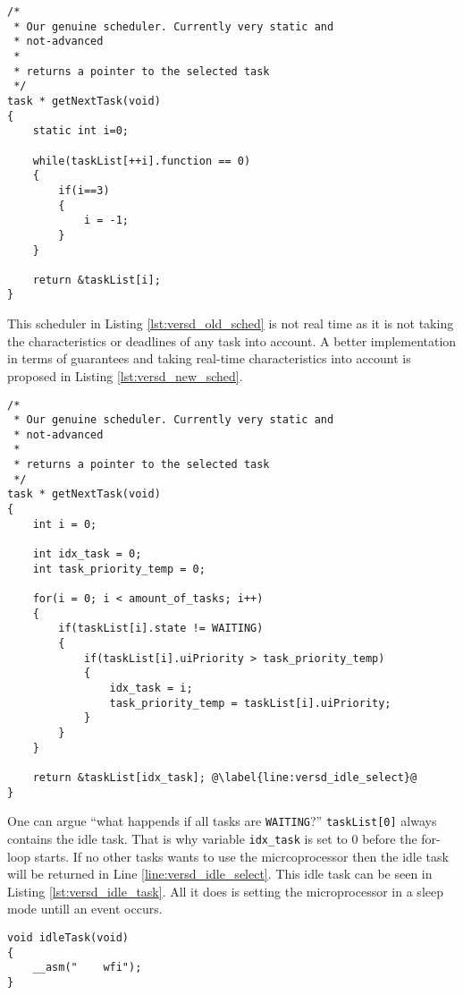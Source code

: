 \begin{lstlisting}[style=CStyle, caption={A relatively stupid scheduler}, captionpos=b, label={lst:versd_old_sched}, escapechar=@]
/*
 * Our genuine scheduler. Currently very static and
 * not-advanced
 *
 * returns a pointer to the selected task
 */
task * getNextTask(void)
{
	static int i=0;

	while(taskList[++i].function == 0)
	{
		if(i==3)
		{
			i = -1;
		}
	}

	return &taskList[i];
}
\end{lstlisting}

This scheduler in Listing \ref{lst:versd_old_sched} is not real time as it is not taking the characteristics or deadlines of any task into account.
A better implementation in terms of guarantees and taking real-time characteristics into account is proposed in Listing \ref{lst:versd_new_sched}.

\newpage
\begin{lstlisting}[style=CStyle, caption={An improved scheduler taking task characteristics into account}, captionpos=b, label={lst:versd_new_sched}, escapechar=@]
/*
 * Our genuine scheduler. Currently very static and
 * not-advanced
 *
 * returns a pointer to the selected task
 */
task * getNextTask(void)
{
    int i = 0;

    int idx_task = 0;
    int task_priority_temp = 0;

    for(i = 0; i < amount_of_tasks; i++)
    {
	    if(taskList[i].state != WAITING)
	    {
            if(taskList[i].uiPriority > task_priority_temp)
            {
                idx_task = i;
                task_priority_temp = taskList[i].uiPriority;
            }
        }
    }

    return &taskList[idx_task]; @\label{line:versd_idle_select}@
}
\end{lstlisting}

One can argue \enquote{what happends if all tasks are \texttt{WAITING}?}
\texttt{taskList[0]} always contains the idle task.
That is why variable \texttt{idx\_task} is set to 0 before the for-loop starts.
If no other tasks wants to use the micrcoprocessor then the idle task will be returned in Line \ref{line:versd_idle_select}.
This idle task can be seen in Listing \ref{lst:versd_idle_task}.
All it does is setting the microprocessor in a sleep mode untill an event occurs.

\begin{lstlisting}[style=CStyle, caption={An idle task basically setting the microprocesor in a sleep mode}, captionpos=b, label={lst:versd_idle_task}, escapechar=@]
void idleTask(void)
{
    __asm("    wfi");
}
\end{lstlisting}


